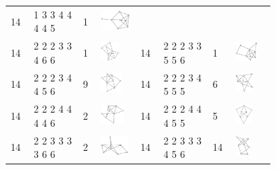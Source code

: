\begin{footnotesize}
\begin{longtable}{
        m{0.05\linewidth} m{0.15\linewidth} m{0.05\linewidth} m{0.12\linewidth} |
        m{0.05\linewidth} m{0.15\linewidth} m{0.05\linewidth} m{0.12\linewidth}
    }
14 & 1 3 3 4 4 4 4 5 & 1 & \includegraphics[height=0.7151cm]{15-universal-graphs/img/degree-sequences-example-graphs/graph-4-8-79}\\
14 & 2 2 2 3 3 4 6 6 & 1 & \includegraphics[height=0.7151cm]{15-universal-graphs/img/degree-sequences-example-graphs/graph-4-8-80} &
14 & 2 2 2 3 3 5 5 6 & 1 & \includegraphics[height=0.7151cm]{15-universal-graphs/img/degree-sequences-example-graphs/graph-4-8-81}\\
14 & 2 2 2 3 4 4 5 6 & 9 & \includegraphics[height=0.7151cm]{15-universal-graphs/img/degree-sequences-example-graphs/graph-4-8-82} &
14 & 2 2 2 3 4 5 5 5 & 6 & \includegraphics[height=0.7151cm]{15-universal-graphs/img/degree-sequences-example-graphs/graph-4-8-83}\\
14 & 2 2 2 4 4 4 4 6 & 2 & \includegraphics[height=0.7151cm]{15-universal-graphs/img/degree-sequences-example-graphs/graph-4-8-84} &
14 & 2 2 2 4 4 4 5 5 & 5 & \includegraphics[height=0.7151cm]{15-universal-graphs/img/degree-sequences-example-graphs/graph-4-8-85}\\
14 & 2 2 3 3 3 3 6 6 & 2 & \includegraphics[height=0.7151cm]{15-universal-graphs/img/degree-sequences-example-graphs/graph-4-8-86} &
14 & 2 2 3 3 3 4 5 6 & 14 & \includegraphics[height=0.7151cm]{15-universal-graphs/img/degree-sequences-example-graphs/graph-4-8-87}\\

\end{longtable}
\end{footnotesize}
